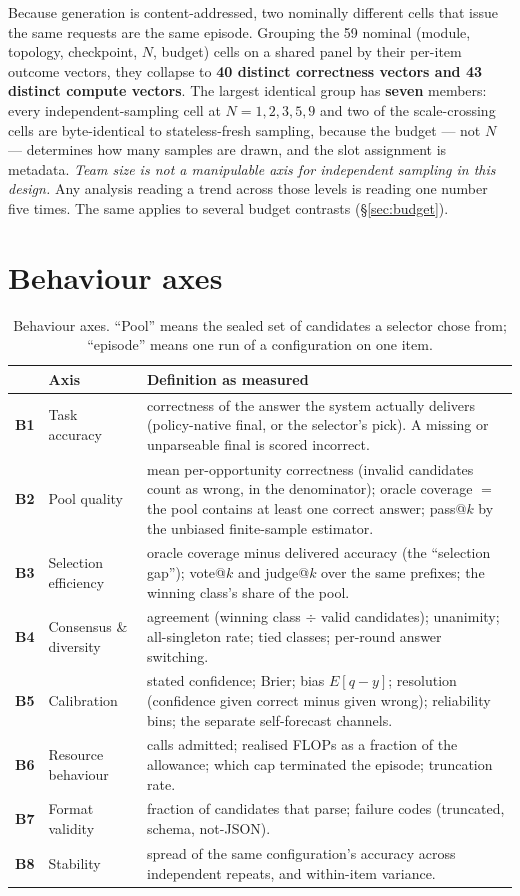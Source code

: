 \documentclass[10pt,a4paper]{article}
\newcommand{\bx}[1]{\textcolor{warm}{\textbf{#1}}}
\begin{document}
Because generation is content-addressed, two nominally different cells that issue the same requests are the same episode. Grouping the 59 nominal (module, topology, checkpoint, $N$, budget) cells on a shared panel by their per-item outcome vectors, they collapse to \textbf{40 distinct correctness vectors and 43 distinct compute vectors}. The largest identical group has \textbf{seven} members: every independent-sampling cell at $N=1,2,3,5,9$ and two of the scale-crossing cells are byte-identical to stateless-fresh sampling, because the budget --- not $N$ --- determines how many samples are drawn, and the slot assignment is metadata. \emph{Team size is not a manipulable axis for independent sampling in this design.} Any analysis reading a trend across those levels is reading one number five times. The same applies to several budget contrasts (\S\ref{sec:budget}).

\section{Behaviour axes}\label{sec:behaviour}

\begin{table}[H]\centering\small
\caption{Behaviour axes. ``Pool'' means the sealed set of candidates a selector chose from; ``episode'' means one run of a configuration on one item.}
\label{tab:behaviour}
\begin{tabular}{@{}llp{9.4cm}@{}}
\toprule
& Axis & Definition as measured \\
\midrule
\bx{B1} & Task accuracy & correctness of the answer the system actually delivers (policy-native final, or the selector's pick). A missing or unparseable final is scored incorrect. \\
\bx{B2} & Pool quality & mean per-opportunity correctness (invalid candidates count as wrong, in the denominator); oracle coverage $=$ the pool contains at least one correct answer; pass@$k$ by the unbiased finite-sample estimator. \\
\bx{B3} & Selection efficiency & oracle coverage minus delivered accuracy (the ``selection gap''); vote@$k$ and judge@$k$ over the same prefixes; the winning class's share of the pool. \\
\bx{B4} & Consensus \& diversity & agreement (winning class $\div$ valid candidates); unanimity; all-singleton rate; tied classes; per-round answer switching. \\
\bx{B5} & Calibration & stated confidence; Brier; bias $E[q-y]$; resolution (confidence given correct minus given wrong); reliability bins; the separate self-forecast channels. \\
\bx{B6} & Resource behaviour & calls admitted; realised FLOPs as a fraction of the allowance; which cap terminated the episode; truncation rate. \\
\bx{B7} & Format validity & fraction of candidates that parse; failure codes (truncated, schema, not-JSON). \\
\bx{B8} & Stability & spread of the same configuration's accuracy across independent repeats, and within-item variance. \\
\bottomrule
\end{tabular}
\end{table}
\end{document}
